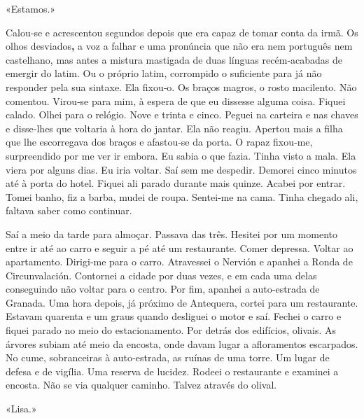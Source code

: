 «Estamos.»

Calou­‑se e acrescentou segundos depois que era capaz de tomar conta da
irmã. Os olhos desviados\textbf{,} a voz a falhar e uma pronúncia que
não era nem português nem castelhano, mas antes a mistura mastigada de
duas línguas recém­‑acabadas de emergir do latim. Ou o próprio latim,
corrompido o suficiente para já não responder pela sua sintaxe. Ela
fixou­‑o. Os braços magros, o rosto macilento. Não comentou. Virou­‑se
para mim, à espera de que eu dissesse alguma coisa. Fiquei calado. Olhei
para o relógio. Nove e trinta e cinco. Peguei na carteira e nas chaves e
disse­‑lhes que voltaria à hora do jantar. Ela não reagiu. Apertou mais
a filha que lhe escorregava dos braços e afastou­‑se da porta. O rapaz
fixou­‑me, surpreendido por me ver ir embora. Eu sabia o que fazia.
Tinha visto a mala. Ela viera por alguns dias. Eu iria voltar. Saí sem
me despedir. Demorei cinco minutos até à porta do hotel. Fiquei ali
parado durante mais quinze. Acabei por entrar. Tomei banho, fiz a barba,
mudei de roupa. Sentei­‑me na cama. Tinha chegado ali, faltava saber
como continuar.

Saí a meio da tarde para almoçar. Passava das três. Hesitei por um
momento entre ir até ao carro e seguir a pé até um restaurante. Comer
depressa. Voltar ao apartamento. Dirigi­‑me para o carro. Atravessei o
Nervión e apanhei a\textbf{ }Ronda de Circunvalación. Contornei a cidade
por duas vezes, e em cada uma delas conseguindo não voltar para o
centro. Por fim, apanhei a auto­‑estrada de Granada. Uma hora depois, já
próximo de Antequera, cortei para um restaurante. Estavam quarenta e um
graus quando desliguei o motor e saí. Fechei o carro e fiquei parado no
meio do estacionamento. Por detrás dos edifícios, olivais. As árvores
subiam até meio da encosta, onde davam lugar a afloramentos escarpados.
No cume, sobranceiras à auto­‑estrada, as ruínas de uma torre. Um lugar
de defesa e de vigília. Uma reserva de lucidez. Rodeei o restaurante e
examinei a encosta. Não se via qualquer caminho. Talvez através do
olival.

«Lisa.»

